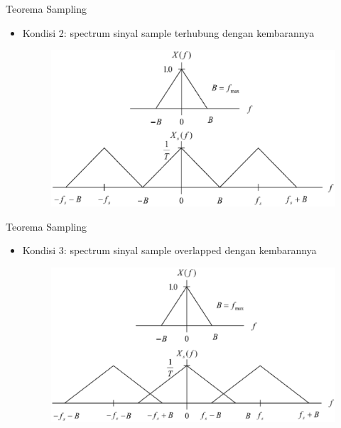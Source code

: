 \documentclass[pdflatex,compress,mathserif]{beamer}
\begin{document}
\begin{frame}{Teorema Sampling}
    \begin{itemize}
        \item Kondisi 2: spectrum sinyal sample terhubung dengan kembarannya
        \begin{figure}
            \includegraphics[width=0.9\linewidth]{./img/img10}
        \end{figure}
    \end{itemize}
\end{frame}

\begin{frame}{Teorema Sampling}
    \begin{itemize}
        \item Kondisi 3: spectrum sinyal sample overlapped dengan kembarannya
        \begin{figure}
            \includegraphics[width=0.9\linewidth]{./img/img11}
        \end{figure}
    \end{itemize}
\end{frame}
\end{document}
